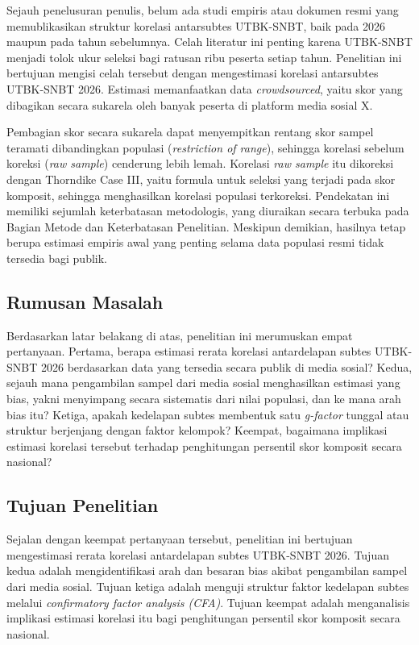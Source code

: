 Sejauh penelusuran penulis, belum ada studi empiris atau dokumen resmi yang memublikasikan struktur korelasi antarsubtes UTBK-SNBT, baik pada 2026 maupun pada tahun sebelumnya. Celah literatur ini penting karena UTBK-SNBT menjadi tolok ukur seleksi bagi ratusan ribu peserta setiap tahun. Penelitian ini bertujuan mengisi celah tersebut dengan mengestimasi korelasi antarsubtes UTBK-SNBT 2026. Estimasi memanfaatkan data \textit{crowdsourced}, yaitu skor yang dibagikan secara sukarela oleh banyak peserta di platform media sosial X.

Pembagian skor secara sukarela dapat menyempitkan rentang skor sampel teramati dibandingkan populasi (\textit{restriction of range}), sehingga korelasi sebelum koreksi (\textit{raw sample}) cenderung lebih lemah. Korelasi \textit{raw sample} itu dikoreksi dengan Thorndike Case III, yaitu formula untuk seleksi yang terjadi pada skor komposit, sehingga menghasilkan korelasi populasi terkoreksi. Pendekatan ini memiliki sejumlah keterbatasan metodologis, yang diuraikan secara terbuka pada Bagian Metode dan Keterbatasan Penelitian. Meskipun demikian, hasilnya tetap berupa estimasi empiris awal yang penting selama data populasi resmi tidak tersedia bagi publik.

\subsection{Rumusan Masalah}
Berdasarkan latar belakang di atas, penelitian ini merumuskan empat pertanyaan. Pertama, berapa estimasi rerata korelasi antardelapan subtes UTBK-SNBT 2026 berdasarkan data yang tersedia secara publik di media sosial? Kedua, sejauh mana pengambilan sampel dari media sosial menghasilkan estimasi yang bias, yakni menyimpang secara sistematis dari nilai populasi, dan ke mana arah bias itu? Ketiga, apakah kedelapan subtes membentuk satu \textit{g-factor} tunggal atau struktur berjenjang dengan faktor kelompok? Keempat, bagaimana implikasi estimasi korelasi tersebut terhadap penghitungan persentil skor komposit secara nasional?

\subsection{Tujuan Penelitian}
Sejalan dengan keempat pertanyaan tersebut, penelitian ini bertujuan mengestimasi rerata korelasi antardelapan subtes UTBK-SNBT 2026. Tujuan kedua adalah mengidentifikasi arah dan besaran bias akibat pengambilan sampel dari media sosial. Tujuan ketiga adalah menguji struktur faktor kedelapan subtes melalui \textit{confirmatory factor analysis (CFA)}. Tujuan keempat adalah menganalisis implikasi estimasi korelasi itu bagi penghitungan persentil skor komposit secara nasional.

